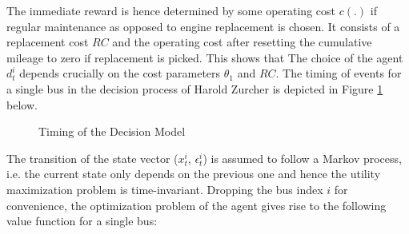 The immediate reward is hence determined by some operating cost $c(.)$ if regular maintenance as opposed to engine replacement is chosen. It consists of a replacement cost $RC$ and the operating cost after resetting the cumulative mileage to zero if replacement is picked. This shows that The choice of the agent $d^i_t$ depends crucially on the cost parameters $\theta_1$ and $RC$. The timing of events for a single bus in the decision process of Harold Zurcher is depicted in Figure \ref{Figure1} below. 
\vspace{3ex}

\begin{figure}[H]
	\caption{\label{Figure1}Timing of the Decision Model}
	\vspace{2ex}
\end{figure}
\vspace{2.5ex}

The transition of the state vector ($x^i_t$, $\epsilon^i_t$) is assumed to follow a Markov process, i.e. the current state only depends on the previous one and hence the utility maximization problem is time-invariant. Dropping the bus index $i$ for convenience, the optimization problem of the agent gives rise to the following value function for a single bus: 

